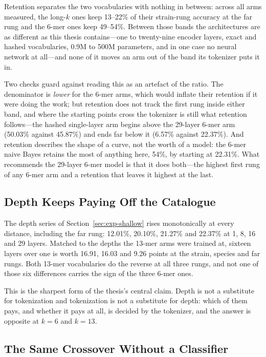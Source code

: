 Retention separates the two vocabularies with nothing in between: across all arms measured, the long-$k$ ones keep 13--22\% of their strain-rung accuracy at the far rung and the 6-mer ones keep 49--54\%. Between those bands the architectures are as different as this thesis contains---one to twenty-nine encoder layers, exact and hashed vocabularies, 0.9M to 500M parameters, and in one case no neural network at all---and none of it moves an arm out of the band its tokenizer puts it in.

Two checks guard against reading this as an artefact of the ratio. The denominator is \emph{lower} for the 6-mer arms, which would inflate their retention if it were doing the work; but retention does not track the first rung inside either band, and where the starting points cross the tokenizer is still what retention follows---the hashed single-layer arm begins above the 29-layer 6-mer arm (50.03\% against 45.87\%) and ends far below it (6.57\% against 22.37\%). And retention describes the shape of a curve, not the worth of a model: the 6-mer naive Bayes retains the most of anything here, 54\%, by starting at 22.31\%. What recommends the 29-layer 6-mer model is that it does both---the highest first rung of any 6-mer arm and a retention that leaves it highest at the last.

\subsection{Depth Keeps Paying Off the Catalogue}

The depth series of Section~\ref{sec:exp-shallow} rises monotonically at every distance, including the far rung: 12.01\%, 20.10\%, 21.27\% and 22.37\% at 1, 8, 16 and 29 layers. Matched to the depths the 13-mer arms were trained at, sixteen layers over one is worth 16.91, 16.03 and 9.26 points at the strain, species and far rungs. Both 13-mer vocabularies do the reverse at all three rungs, and not one of those six differences carries the sign of the three 6-mer ones.

This is the sharpest form of the thesis's central claim. Depth is not a substitute for tokenization and tokenization is not a substitute for depth: which of them pays, and whether it pays at all, is decided by the tokenizer, and the answer is opposite at $k=6$ and $k=13$.

\subsection{The Same Crossover Without a Classifier}

